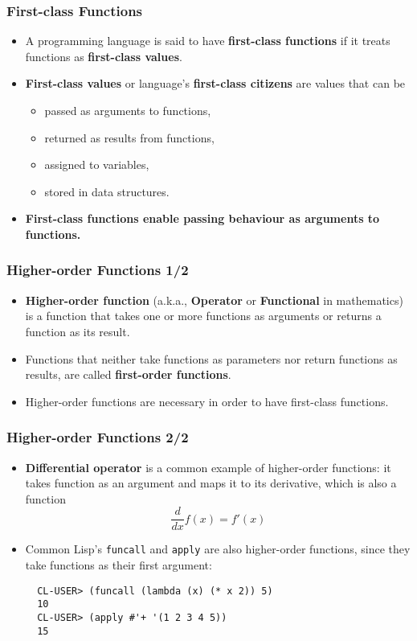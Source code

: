 \documentclass{beamer}
\begin{document}
\begin{frame}[fragile]
  \frametitle{First-class Functions}
  \begin{itemize}
  \item A programming language is said to have \textbf{first-class functions} if
    it treats functions as \textbf{first-class values}.
  \item \textbf{First-class values} or language's \textbf{first-class citizens}
    are values that can be
    \begin{itemize}
    \item passed as arguments to functions,
    \item returned as results from functions,
    \item assigned to variables,
    \item stored in data structures.
    \end{itemize}
  \item \textbf{First-class functions enable passing behaviour as arguments to
      functions.}
  \end{itemize}
\end{frame}

\begin{frame}[fragile]
  \frametitle{Higher-order Functions 1/2}
  \begin{itemize}
  \item \textbf{Higher-order function} (a.k.a., \textbf{Operator} or
    \textbf{Functional} in mathematics) is a function that takes one or more
    functions as arguments or returns a function as its result.
  \item Functions that neither take functions as parameters nor return functions
    as results, are called \textbf{first-order functions}.
  \item Higher-order functions are necessary in order to have first-class
    functions.
  \end{itemize}
\end{frame}

\begin{frame}[fragile]
  \frametitle{Higher-order Functions 2/2}
  \begin{itemize}
  \item \textbf{Differential operator} is a common example of higher-order
    functions: it takes function as an argument and maps it to its derivative,
    which is also a function
    $$\dfrac{d}{dx} f(x) = f'(x)$$
  \item Common Lisp's \texttt{funcall} and \texttt{apply}
    are also higher-order functions, since they take functions as their first
    argument:
\begin{verbatim}
  CL-USER> (funcall (lambda (x) (* x 2)) 5)
  10
  CL-USER> (apply #'+ '(1 2 3 4 5))
  15
\end{verbatim}
  \end{itemize}
\end{frame}
\end{document}
